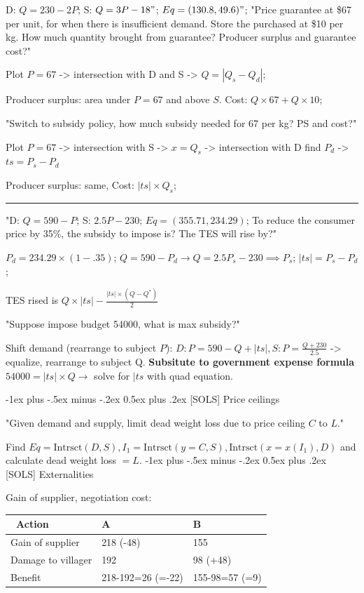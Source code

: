 \documentclass[a4paper]{article}
\makeatletter
\renewcommand{\section}{\@startsection{section}{1}{0mm}%
                                {-1ex plus -.5ex minus -.2ex}%
                                {0.5ex plus .2ex}%
                                {\normalfont\small\bfseries}}
\makeatother
\begin{document}
\begin{multicols*}{3}
    D: $Q=230-2P$; S: $Q=3P-18"$; $Eq = (130.8,49.6)"$; "Price guarantee at \$67 per unit, for when there is insufficient demand. Store the purchased at \$10 per kg. How much quantity brought from guarantee? Producer surplus and guarantee cost?"

    Plot $P=67$ -> intersection with D and S -> $Q=|Q_s-Q_d|$;

    Producer surplus: area under $P=67$ and above $S$. Cost: $Q \times 67 + Q \times 10$;

    "Switch to subsidy policy, how much subsidy needed for 67 per kg? PS and cost?"

    Plot $P=67$ -> intersection with S -> $x=Q_s$ -> intersection with D find $P_d$ -> $ts = P_s - P_d$

    Producer surplus: same, Cost: $|ts| \times Q_s$;

    \rule{1\linewidth}{0.4pt}

    "D: $Q=590-P$; S: $2.5P-230$; $Eq = (355.71,234.29)$; To reduce the consumer price by 35\%, the subsidy to impose is? The TES will rise by?"

    $P_d = 234.29 \times (1-.35)$; $Q=590-P_d \to Q= 2.5P_s-230 \implies P_s$; $|ts| = P_s - P_d$;

    TES rised is $Q\times |ts| - \frac{|ts| \times (Q-Q^*)}{2}$

    "Suppose impose budget 54000, what is max subsidy?"

    Shift demand (rearrange to subject $P$): $D: P=590-Q+|ts|, S: P=\frac{Q+230}{2.5}$ -> equalize, rearrange to subject Q. \textbf{Subsitute to government expense formula} $54000 = |ts| \times Q \to$ solve for $|ts$ with quad equation.

    \section{[SOLS] Price ceilings}

    "Given demand and supply, limit dead weight loss due to price ceiling $C$ to $L$."

    Find $Eq=\text{Intrsct}(D, S), I_1=\text{Intrsct}(y=C, S), \text{Intrsct}(x=x(I_1), D)$ and calculate dead weight loss $=L$.
    \section{[SOLS] Externalities}

    Gain of supplier, negotiation cost:

    \begin{tabular}{|l|l|l|}
        \hline
        \ Action           & A                 & B              \\\hline
        Gain of supplier   & 218 (-48)         & 155            \\
        Damage to villager & 192               & 98 (+48)       \\\hline
        Benefit            & 218-192=26 (=-22) & 155-98=57 (=9) \\\hline
    \end{tabular}


\end{multicols*}
\end{document}
